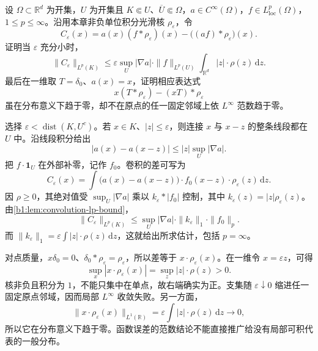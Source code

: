 \begin{optionalexercise}\label{b1:ex:20-smoothing-variable-coefficient}
设 \(\Omega\subset\mathbb R^d\) 为开集，\(U\) 为开集且 \(K\Subset U\)、\(\overline U\Subset\Omega\)，\(a\in C^\infty(\Omega)\)，\(f\in L^p_{\mathrm{loc}}(\Omega)\)，\(1\le p\le\infty\)。沿用本章非负单位积分光滑核 \(\rho_\varepsilon\)，令
\[
 C_\varepsilon(x)=a(x)(f*\rho_\varepsilon)(x)-\bigl((af)*\rho_\varepsilon\bigr)(x).
\]
证明当 \(\varepsilon\) 充分小时，
\[
 \|C_\varepsilon\|_{L^p(K)}
 \le\varepsilon\sup_U|\nabla a|\cdot\|f\|_{L^p(U)}
       \int_{\mathbb R^d}|z|\cdot \rho(z)\,\mathrm dz.
\]
最后在一维取 \(T=\delta_0\)、\(a(x)=x\)，证明相应表达式
\[
 x(T*\rho_\varepsilon)-(xT)*\rho_\varepsilon
\]
虽在分布意义下趋于零，却不在原点的任一固定邻域上依 \(L^\infty\) 范数趋于零。
\end{optionalexercise}
\begin{solution}
选择 \(\varepsilon<\operatorname{dist}(K,U^c)\)。若 \(x\in K\)、\(|z|\le\varepsilon\)，则连接 \(x\) 与 \(x-z\) 的整条线段都在 \(U\) 中。沿线段积分给出
\[
 |a(x)-a(x-z)|\le |z|\sup_U|\nabla a|.
\]
把 \(f\cdot\mathbf1_U\) 在外部补零，记作 \(f_0\)。卷积的差可写为
\[
 C_\varepsilon(x)=\int\bigl(a(x)-a(x-z)\bigr)\cdot f_0(x-z)\cdot\rho_\varepsilon(z)\,\mathrm dz.
\]
因 \(\rho\ge0\)，其绝对值受 \(\sup_U|\nabla a|\) 乘以 \(k_\varepsilon*|f_0|\) 控制，其中 \(k_\varepsilon(z)=|z|\rho_\varepsilon(z)\)。由\cref{b1:lem:convolution-lp-bound}，
\[
 \|C_\varepsilon\|_{L^p(K)}
 \le\sup_U|\nabla a|\cdot\|k_\varepsilon\|_1\cdot\|f_0\|_p.
\]
而 \(\|k_\varepsilon\|_1=\varepsilon\int|z|\cdot \rho(z)\,\mathrm dz\)，这就给出所求估计，包括 \(p=\infty\)。

对点质量，\(x\delta_0=0\)、\(\delta_0*\rho_\varepsilon=\rho_\varepsilon\)，所以差等于 \(x\cdot \rho_\varepsilon(x)\)。在一维令 \(x=\varepsilon z\)，可得
\[
 \sup_x|x\cdot \rho_\varepsilon(x)|=\sup_z|z|\cdot \rho(z)>0.
\]
核非负且积分为 \(1\)，不能只集中在单点，故右端确实为正。支集随 \(\varepsilon\downarrow0\) 缩进任一固定原点邻域，因而局部 \(L^\infty\) 收敛失败。另一方面，
\[
 \|x\cdot \rho_\varepsilon(x)\|_{L^1(\mathbb R)}
 =\varepsilon\int|z|\cdot \rho(z)\,\mathrm dz\longrightarrow0,
\]
所以它在分布意义下趋于零。函数误差的范数结论不能直接推广给没有局部可积代表的一般分布。
\end{solution}


